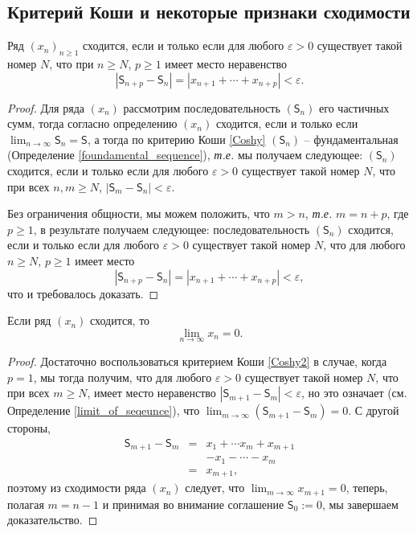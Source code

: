 \subsection{Критерий Коши и некоторые признаки сходимости}

\begin{theorem}\label{Coshy2}
    Ряд $(x_n)_{n\ge 1}$ сходится, если и только если для любого $\varepsilon >0$ существует такой номер $N$, что при $n \ge N$, $p\ge 1$ имеет место неравенство
    \[
     |\mathsf{S}_{n+p} -\mathsf{S}_n| = |x_{n+1}+ \cdots + x_{n+p}| < \varepsilon.
    \]
\end{theorem}

\begin{proof}
  Для ряда $(x_n)$ рассмотрим последовательность $(\mathsf{S}_n)$ его частичных сумм, тогда согласно определению $(x_n)$ сходится, если и только если $\lim_{n \to \infty} \mathsf{S}_n =\mathsf{S}$, а тогда по критерию Коши \ref{Coshy} $(\mathsf{S}_n)$ -- фундаментальная (Определение \ref{foundamental_sequence}), \textit{т.е.} мы получаем следующее: $(\mathsf{S}_n)$ сходится, если и только если для любого $\varepsilon >0$ существует такой номер $N$, что при всех $n,m \ge N$, $|\mathsf{S}_m- \mathsf{S}_n| < \varepsilon$.
  
  Без ограничения общности, мы можем положить, что $m>n$, \textit{т.е.} $m= n+p$, где $p \ge 1$, в результате получаем следующее: последовательность $(\mathsf{S}_n)$ сходится, если и только если для любого $\varepsilon >0$ существует такой номер $N$, что для любого $n \ge N$, $p \ge 1$ имеет место
  \[
   |\mathsf{S}_{n+p} - \mathsf{S}_n| = |x_{n+1} + \cdots+  x_{n+p}| < \varepsilon,
  \]
  что и требовалось доказать.
\end{proof}


\begin{corollary}\label{nessesary_for_series}
    Если ряд $(x_n)$ сходится, то 
    \[
     \lim_{n \to \infty} x_n =0.
    \]
    \end{corollary}
\begin{proof}
  Достаточно воспользоваться критерием Коши \ref{Coshy2} в случае, когда $p=1$, мы тогда получим, что для любого $\varepsilon >0$ существует такой номер $N$, что при всех $m \ge N$, имеет место неравенство $|\mathsf{S}_{m+1} - \mathsf{S}_m| < \varepsilon$, но это означает (см. Определение \ref{limit_of_seqeunce}), что $\lim_{m \to \infty} (\mathsf{S}_{m+1} - \mathsf{S}_m)=0$. С другой стороны, 
  \begin{eqnarray*}
      \mathsf{S}_{m+1} -\mathsf{S}_m &=& x_1 + \cdots x_m + x_{m+1} \\
      && - x_1 - \cdots - x_m \\
      &=& x_{m+1},
  \end{eqnarray*}
  поэтому из сходимости ряда $(x_n)$ следует, что $\lim_{m\to \infty }x_{m+1} = 0$, теперь, полагая $m = n-1$ и принимая во внимание соглашение $\mathsf{S}_0 :=0$, мы завершаем доказательство.
\end{proof}

